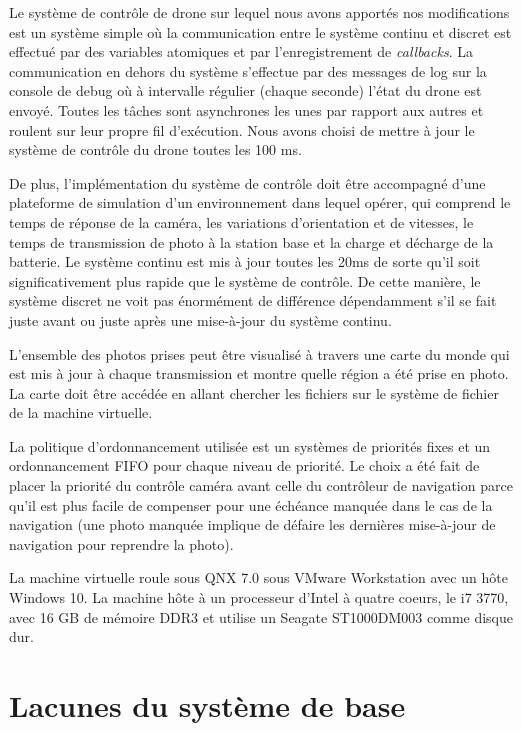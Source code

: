 \documentclass[journal]{IEEEtran}
\begin{document}
Le système de contrôle de drone sur lequel nous avons apportés nos modifications est un système simple où la communication entre le système continu et discret est effectué par des variables atomiques et par l'enregistrement de \textit{callbacks}. La communication en dehors du système s'effectue par des messages de log sur la console de debug où à intervalle régulier (chaque seconde) l'état du drone est envoyé. Toutes les tâches sont asynchrones les unes par rapport aux autres et roulent sur leur propre fil d'exécution. Nous avons choisi de mettre à jour le système de contrôle du drone toutes les 100 ms.

De plus, l'implémentation du système de contrôle doit être accompagné d'une plateforme de simulation d'un environnement dans lequel opérer, qui comprend le temps de réponse de la caméra, les variations d'orientation et de vitesses, le temps de transmission de photo à la station base et la charge et décharge de la batterie. Le système continu est mis à jour toutes les 20ms de sorte qu'il soit significativement plus rapide que le système de contrôle. De cette manière, le système discret ne voit pas énormément de différence dépendamment s'il se fait juste avant ou juste après une mise-à-jour du système continu.

L'ensemble des photos prises peut être visualisé à travers une carte du monde qui est mis à jour à chaque transmission et montre quelle région a été prise en photo. La carte doit être accédée en allant chercher les fichiers sur le système de fichier de la machine virtuelle.

La politique d'ordonnancement utilisée est un systèmes de priorités fixes et un ordonnancement FIFO pour chaque niveau de priorité. Le choix a été fait de placer la priorité du contrôle caméra avant celle du contrôleur de navigation parce qu'il est plus facile de compenser pour une échéance manquée dans le cas de la navigation (une photo manquée implique de défaire les dernières mise-à-jour de navigation pour reprendre la photo).

La machine virtuelle roule sous QNX 7.0 sous VMware Workstation avec un hôte Windows 10. La machine hôte à un processeur d'Intel à quatre coeurs, le i7 3770, avec 16 GB de mémoire DDR3 et utilise un Seagate ST1000DM003 comme disque dur. 


\section{Lacunes du système de base}
\label{lacunes}
\end{document}
